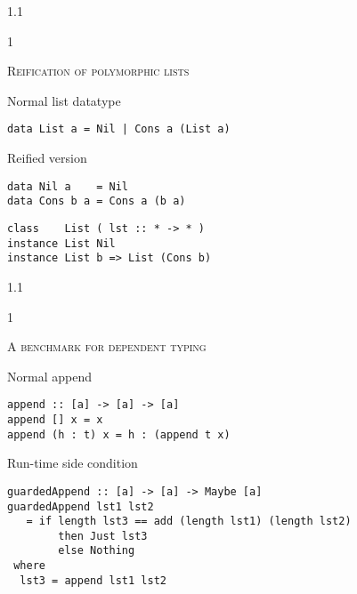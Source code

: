 \documentclass{slides}
\newcommand{\header}[1]{{\large\scshape \color{Red} #1} \medskip }
\newcommand{\blau}[1]{{\color{Blue} #1} \medskip }
\newenvironment{myslide}{\begin{slide}\color{Blue}\begin{boxedminipage}{1.1\hsize}\begin{boxedminipage}{1\hsize}\color{Black}
\vspace{-170\in}
}{%
\smallskip
\end{boxedminipage}
\end{boxedminipage}
\end{slide}}
\begin{document}



\begin{myslide}

\header{Reification of polymorphic lists}

\blau{Normal list datatype}

\begin{Verbatim}[fontseries=normal,fontsize=\tiny]
data List a = Nil | Cons a (List a)
\end{Verbatim}

\medskip

\blau{Reified version}

\begin{Verbatim}[fontseries=normal,fontsize=\tiny]
data Nil a    = Nil
data Cons b a = Cons a (b a)
\end{Verbatim}
\medskip
\begin{Verbatim}[fontseries=normal,fontsize=\tiny]
class    List ( lst :: * -> * )
instance List Nil
instance List b => List (Cons b)
\end{Verbatim}

\end{myslide}






\begin{myslide}

\header{A benchmark for dependent typing}

\blau{Normal append}

\begin{Verbatim}[fontseries=normal,fontsize=\tiny]
append :: [a] -> [a] -> [a]
append [] x = x
append (h : t) x = h : (append t x)
\end{Verbatim}

\medskip

\blau{Run-time side condition}

\begin{Verbatim}[fontseries=normal,fontsize=\tiny]
guardedAppend :: [a] -> [a] -> Maybe [a]
guardedAppend lst1 lst2
   = if length lst3 == add (length lst1) (length lst2) 
        then Just lst3
        else Nothing
 where
  lst3 = append lst1 lst2
\end{Verbatim}

\end{myslide}
\end{document}
